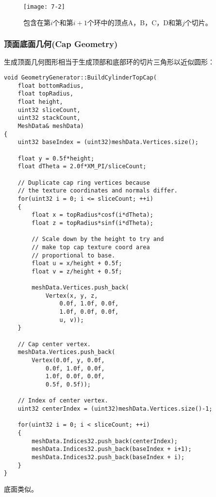 \begin{figure}[h]
    \texttt{[image: 7-2]}
    \centering
    \caption{包含在第$i$个和第$i + 1$个环中的顶点A，B，C，D和第$j$个切片。}
    \label{fig:7-2}
\end{figure}

\subsubsection{顶面底面几何(Cap Geometry)}
\begin{flushleft}
生成顶面几何图形相当于生成顶部和底部环的切片三角形以近似圆形：\\
\end{flushleft}
\begin{lstlisting}
void GeometryGenerator::BuildCylinderTopCap(
    float bottomRadius, 
    float topRadius, 
    float height,
    uint32 sliceCount, 
    uint32 stackCount, 
    MeshData& meshData)
{
    uint32 baseIndex = (uint32)meshData.Vertices.size();

    float y = 0.5f*height;
    float dTheta = 2.0f*XM_PI/sliceCount;

    // Duplicate cap ring vertices because 
    // the texture coordinates and normals differ.
    for(uint32 i = 0; i <= sliceCount; ++i)
    {
        float x = topRadius*cosf(i*dTheta);
        float z = topRadius*sinf(i*dTheta);

        // Scale down by the height to try and 
        // make top cap texture coord area
        // proportional to base.
        float u = x/height + 0.5f;
        float v = z/height + 0.5f;

        meshData.Vertices.push_back(
            Vertex(x, y, z, 
                0.0f, 1.0f, 0.0f, 
                1.0f, 0.0f, 0.0f, 
                u, v));
    }

    // Cap center vertex.
    meshData.Vertices.push_back(
        Vertex(0.0f, y, 0.0f, 
            0.0f, 1.0f, 0.0f, 
            1.0f, 0.0f, 0.0f, 
            0.5f, 0.5f));

    // Index of center vertex.
    uint32 centerIndex = (uint32)meshData.Vertices.size()-1;

    for(uint32 i = 0; i < sliceCount; ++i)
    {
        meshData.Indices32.push_back(centerIndex);
        meshData.Indices32.push_back(baseIndex + i+1);
        meshData.Indices32.push_back(baseIndex + i);
    }
}
\end{lstlisting}
\begin{flushleft}
底面类似。\\
\end{flushleft}

